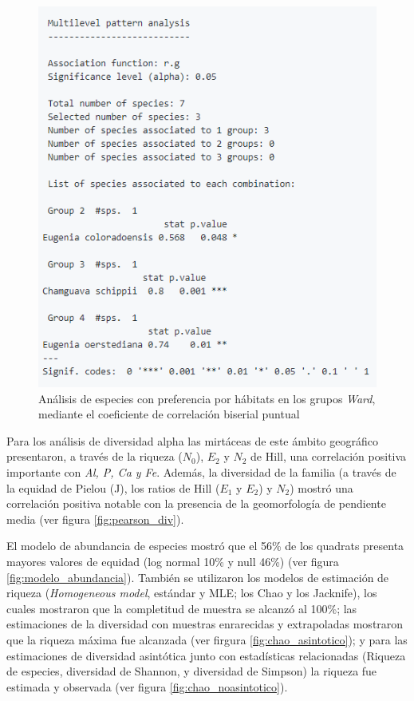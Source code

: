 \documentclass[11pt,]{article}
\begin{document}
\begin{figure}
\centering
\includegraphics{rg_analisis.png}
\caption{Análisis de especies con preferencia por hábitats en los grupos
\emph{Ward}, mediante el coeficiente de correlación biserial puntual
\label{fig:rg_analisis}}
\end{figure}

Para los análisis de diversidad alpha las mirtáceas de este ámbito
geográfico presentaron, a través de la riqueza (\(N_0\)), \(E_2\) y
\(N_2\) de Hill, una correlación positiva importante con \emph{Al, P, Ca
y Fe}. Además, la diversidad de la familia (a través de la equidad de
Pielou (J), los ratios de Hill (\(E_1\) y \(E_2\)) y \(N_2\)) mostró una
correlación positiva notable con la presencia de la geomorfología de
pendiente media (ver figura \ref{fig:pearson_div}).

El modelo de abundancia de especies mostró que el 56\% de los quadrats
presenta mayores valores de equidad (log normal 10\% y null 46\%) (ver
figura \ref{fig:modelo_abundancia}). También se utilizaron los modelos
de estimación de riqueza (\emph{Homogeneous model}, estándar y MLE; los
Chao y los Jacknife), los cuales mostraron que la completitud de muestra
se alcanzó al 100\%; las estimaciones de la diversidad con muestras
enrarecidas y extrapoladas mostraron que la riqueza máxima fue alcanzada
(ver firgura \ref{fig:chao_asintotico}); y para las estimaciones de
diversidad asintótica junto con estadísticas relacionadas (Riqueza de
especies, diversidad de Shannon, y diversidad de Simpson) la riqueza fue
estimada y observada (ver figura \ref{fig:chao_noasintotico}).
\end{document}

